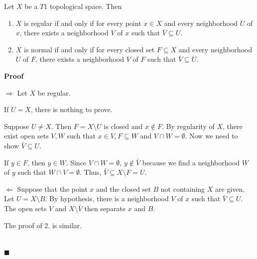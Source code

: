 \documentclass[main.tex]{subfiles}
\begin{document}
\begin{lemma}
    Let $X$ be a $T1$ topological space. Then
    \begin{enumerate}
        \item $X$ is regular if and only if for every point $x \in X$ and every neighborhood $U$ of $x$, there exists a neighborhood $V$ of $x$ such that $\bar{V} \subseteq U$. 
        \item $X$ is normal if and only if for every closed set $F \subseteq X$ and every neighborhood $U$ of $F$, there exists a neighborhood $V$ of $F$ such that $\bar{V} \subseteq U$.
    \end{enumerate}
\end{lemma}

\par \noindent \textbf{Proof} 
\par $\Rightarrow$ Let $X$ be regular. 
\par If $U = X$, there is nothing to prove.
\par Suppose $U \neq X$. Then $F = X \setminus U$ is closed and $x \notin F$. By regularity of $X$, there exist open sets $V, W$ such that $x \in V, F \subseteq W$ and $V \cap W = \emptyset$. Now we need to show $\bar{V} \subseteq U$. 
\par If $y\in F$, then $y \in W$. Since $V \cap W = \emptyset$, $y \notin \bar{V}$ because we find a neighborhood $W$ of $y$ such that $W \cap V = \emptyset$. Thus, $\bar{V} \subseteq X \setminus F = U$.
\par $\Leftarrow$ Suppose that the point $x$ and the closed set $B$ not containing $X$ are given. Let $U = X \setminus B$. By hypothesis, there is a neighborhood $V$ of $x$ such that $\bar{V} \subseteq U$. The open sets $V$ and $X \setminus \bar{V}$ then separate $x$ and $B$. 

\par The proof of 2. is similar. 

\mbox{} \\ \null \hfill $\blacksquare$ 
\end{document}
